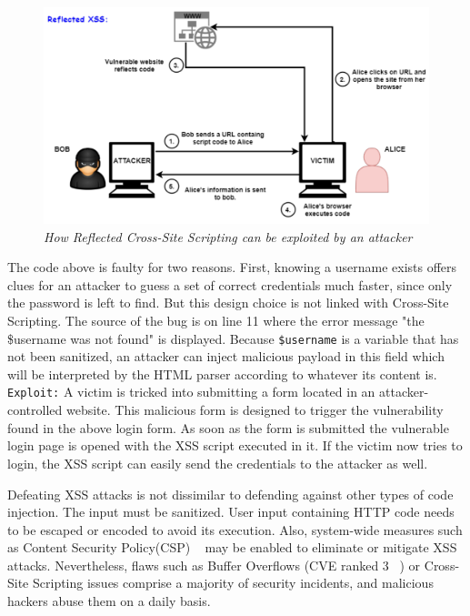 \begin{figure}[ht]
 \centering
 \captionsetup{justification=centering}
 \includegraphics[width=\linewidth]{figures/reflectedxss.pdf}
 \caption{\textit{How Reflected Cross-Site Scripting can be exploited by an attacker}}
 \label{fig:reflectedxss}
\end{figure}

The code above is faulty for two reasons. First, knowing a username exists offers clues for an attacker to guess a set of correct credentials much faster, since only the password is left to find. But this design choice is not linked with Cross-Site Scripting. The source of the bug is on line 11 where the error message "the \$username was not found" is displayed. Because {\tt \$username} is a variable that has not been sanitized, an attacker can inject malicious payload in this field which will be interpreted by the HTML parser according to whatever its content is. 
{\tt Exploit:} A victim is tricked into submitting a form located in an attacker-controlled website. This malicious form is designed to trigger the vulnerability found in the above login form. As soon as the form is submitted the vulnerable login page is opened with the XSS script executed in it. If the victim now tries to login, the XSS script can easily send the
credentials to the attacker as well. 

Defeating XSS attacks is not dissimilar to defending against other types of code injection.
The input must be sanitized. User input containing HTTP code needs to be escaped or encoded to avoid its execution. Also, system-wide measures such as Content Security Policy(CSP) ~\cite{csp_def} may be enabled to eliminate or mitigate XSS attacks. Nevertheless, flaws such as Buffer Overflows (CVE ranked 3 ~\cite{cve}) or Cross-Site Scripting issues comprise a majority of security incidents, and malicious hackers abuse them on a daily basis. 

